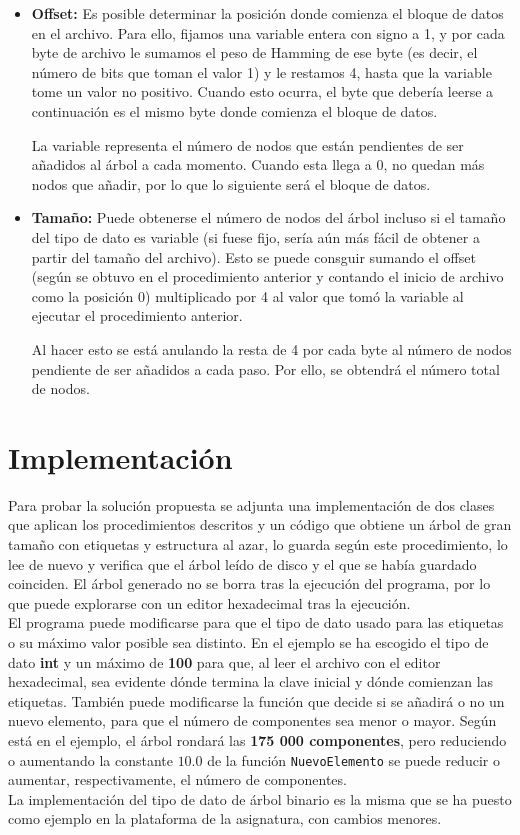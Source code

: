 \documentclass{article}
\begin{document}
\begin{itemize}
	\item \textbf{Offset:} Es posible determinar la posición donde comienza el
	bloque de datos en el archivo. Para ello, fijamos una variable entera con
	signo a 1, y por cada byte de archivo le sumamos el peso de Hamming de ese
	byte (es decir, el número de bits que toman el valor 1) y le restamos 4, hasta
	que la variable tome un valor no positivo. Cuando esto ocurra, el byte que
	debería leerse a continuación es el mismo byte donde comienza el bloque de
	datos.

	La variable representa el número de nodos que están pendientes de ser añadidos
	al árbol a cada momento. Cuando esta llega a 0, no quedan más nodos que añadir,
	por lo que lo siguiente será el bloque de datos.
	\item \textbf{Tamaño:} Puede obtenerse el número de nodos del árbol incluso
	si el tamaño del tipo de dato es variable (si fuese fijo, sería aún más fácil
	de obtener a partir del tamaño del archivo). Esto se puede consguir sumando el
	offset (según se obtuvo en el procedimiento anterior y contando el inicio de
	archivo como la posición 0) multiplicado por 4 al valor que tomó la variable al
	ejecutar el procedimiento anterior.

	Al hacer esto se está anulando la resta de 4 por cada byte al número de nodos
	pendiente de ser añadidos a cada paso. Por ello, se obtendrá el número total
	de nodos.
\end{itemize}

\section{Implementación}

Para probar la solución propuesta se adjunta una implementación de dos clases que
aplican los procedimientos descritos y un código que obtiene un árbol de gran
tamaño con etiquetas y estructura al azar, lo guarda según este procedimiento, lo
lee de nuevo y verifica que el árbol leído de disco y el que se había guardado
coinciden. El árbol generado no se borra tras la ejecución del programa, por lo
que puede explorarse con un editor hexadecimal tras la ejecución. \\

El programa puede modificarse para que el tipo de dato usado para las etiquetas o
su máximo valor posible sea distinto. En el ejemplo se ha escogido el tipo de dato
\textbf{int} y un máximo de \textbf{100} para que, al leer el archivo con el editor
hexadecimal, sea evidente dónde termina la clave inicial y dónde comienzan las
etiquetas. También puede modificarse la función que decide si se añadirá o no
un nuevo elemento, para que el número de componentes sea menor o mayor. Según está
en el ejemplo, el árbol rondará las \textbf{175 000 componentes}, pero reduciendo o
aumentando la constante $10.0$ de la función \texttt{NuevoElemento} se puede
reducir o aumentar, respectivamente, el número de componentes. \\

La implementación del tipo de dato de árbol binario es la misma que se ha puesto
como ejemplo en la plataforma de la asignatura, con cambios menores.
\end{document}

